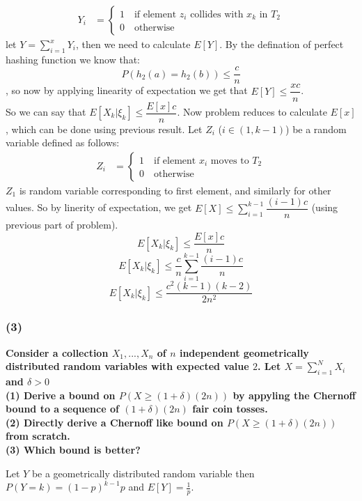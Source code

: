 \documentclass[a4paper]{article}
\begin{document}
\begin{align*}
Y_i & = \begin{cases} 
        1 \quad \text{if element $z_i$ collides with $x_k$ in $T_2$} \\
        0 \quad \text{otherwise}
\end{cases}
\end{align*}
let $Y = \sum_{i=1}^{x}Y_i$, then we need to calculate $E[Y]$. By the defination of perfect hashing function we know that:
$$P(h_2(a) = h_2(b)) \leq \frac{c}{n}$$, so now by applying linearity of expectation we get that $E[Y] \leq \dfrac{xc}{n}$.\\
So we can say that $E[X_k |\xi_{k}] \leq \dfrac{E[x]c}{n}$. Now problem reduces to calculate $E[x]$, which can be done using previous result. Let $Z_i$ ($i \in (1,k-1)$) be a random variable defined as follows:
\begin{align*}
Z_i & = \begin{cases} 
        1 \quad \text{if element $x_i$ moves to $T_2$} \\
        0 \quad \text{otherwise}
\end{cases}
\end{align*}
$Z_1$ is random variable corresponding to first element, and similarly for other values. So by linerity of expectation, we get $E[X] \leq \sum_{i=1}^{k-1} \dfrac{(i-1)c}{n}$ (using previous part of problem). 
$$E[X_k |\xi_{k}] \leq \dfrac{E[x]c}{n}$$
$$E[X_k |\xi_{k}] \leq \dfrac{c}{n}\sum_{i=1}^{k-1} \dfrac{(i-1)c}{n}$$
$$E[X_k |\xi_{k}] \leq \dfrac{c^2(k-1)(k-2)}{2n^2}$$

\subsubsection*{(3)}

\pagebreak



\begin{question}[]
\textbf{Consider a collection $X_1, ..., X_n$ of $n$ independent geometrically distributed random variables with expected value $2$. Let $X = \sum_{i=1}^NX_i$ and $\delta > 0$\\
(1) Derive a bound on $P(X \geq (1 + \delta)(2n))$ by appyling the Chernoff bound to a sequence of $(1 + \delta)(2n)$ fair coin tosses.} \\
\textbf{(2) Directly derive a Chernoff like bound on $P(X \geq (1 + \delta)(2n))$ from scratch.} \\
\textbf{(3) Which bound is better?}

\end{question}
Let $Y$ be a geometrically distributed random variable then $P(Y=k) = (1-p)^{k-1}p$ and $E[Y]=\frac{1}{p}$.
\end{document}
